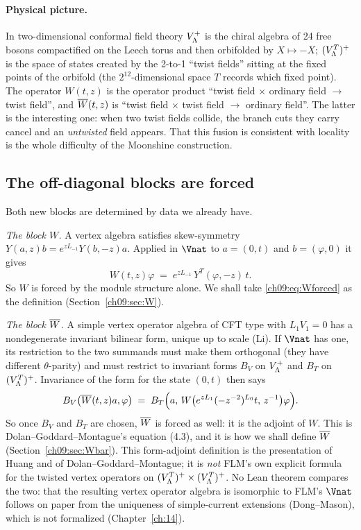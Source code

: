 \paragraph{Physical picture.} In two-dimensional conformal field theory $V_{\Lambda}^{+}$ is the chiral
algebra of 24 free bosons compactified on the Leech torus and then orbifolded by $X\mapsto-X$;
$(V_{\Lambda}^{T})^{+}$ is the space of states created by the 2-to-1 ``twist fields'' sitting at the fixed
points of the orbifold (the $2^{12}$-dimensional space $T$ records which fixed point). The
operator $W(t,z)$ is the operator product ``twist field $\times$ ordinary field $\to$ twist
field'', and $\overline{W}(t,z)$ is ``twist field $\times$ twist field $\to$ ordinary field''. The
latter is the interesting one: when two twist fields collide, the branch cuts they carry cancel
and an \emph{untwisted} field appears. That this fusion is consistent with locality is the whole
difficulty of the Moonshine construction.

\subsection{The off-diagonal blocks are forced}

Both new blocks are determined by data we already have.

\emph{The block $W$.} A vertex algebra satisfies skew-symmetry
$Y(a,z)b=e^{zL_{-1}}Y(b,-z)a$. Applied in $\Vnat$ to $a=(0,t)$ and $b=(\varphi,0)$ it gives
\begin{equation}\label{ch09:eq:Wforced}
  W(t,z)\varphi \;=\; e^{zL_{-1}}\,Y^T(\varphi,-z)\,t .
\end{equation}
So $W$ is forced by the module structure alone. We shall take \eqref{ch09:eq:Wforced} as the
definition (Section~\ref{ch09:sec:W}).

\emph{The block $\overline{W}$.} A simple vertex operator algebra of CFT type with $L_1V_1=0$ has a
nondegenerate invariant bilinear form, unique up to scale (Li). If $\Vnat$ has one, its
restriction to the two summands must make them orthogonal (they have different $\theta$-parity)
and must restrict to invariant forms $B_V$ on $V_{\Lambda}^{+}$ and $B_T$ on $(V_{\Lambda}^{T})^{+}$. Invariance
of the form for the state $(0,t)$ then says
\begin{equation}\label{ch09:eq:Wbarforced}
  B_V\big(\overline{W}(t,z)a,\varphi\big)\;=\;B_T\Big(a,\,W\big(e^{zL_1}(-z^{-2})^{L_0}t,\,z^{-1}\big)\varphi\Big).
\end{equation}
So once $B_V$ and $B_T$ are chosen, $\overline{W}$ is forced as well: it is the adjoint of $W$.
This is Dolan--Goddard--Montague's equation (4.3), and it is how we shall define $\overline{W}$
(Section~\ref{ch09:sec:Wbar}).  This form-adjoint definition is the presentation of Huang and of
Dolan--Goddard--Montague; it is \emph{not} FLM's own explicit formula for the twisted vertex operators
on $(V_{\Lambda}^{T})^{+}\times(V_{\Lambda}^{T})^{+}$.  No Lean theorem compares the two: that the resulting vertex operator
algebra is isomorphic to FLM's $\Vnat$ follows on paper from the uniqueness of simple-current
extensions (Dong--Mason), which is not formalized (Chapter~\ref{ch:14}).

